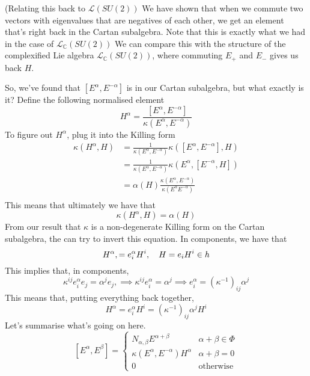 \begin{example}{(Relating this back to $ \mathcal{ L } ( SU ( 2) ) $}
We have shown that when we commute 
two vectors with eigenvalues that are negatives of each other, 
we get an element that's right back in the 
Cartan subalgebra.
Note that this is exactly what we had 
in the case of $ \mathcal{ L } _ \mathbb{ C} ( S U( 2) ) $
We can compare this with the structure of 
the complexified Lie algebra $ \mathcal{ L } _{ \mathbb{ C} } ( SU ( 2) ) $, 
where commuting $ E_ + $ and $ E _ - $ gives us back $ H $. 
\end{example}

So, we've found that $ [ E ^ \alpha , E ^{ - \alpha }  ] $ is 
in our Cartan subalgebra, but what exactly is it? 
Define the following normalised element 
\[
	H ^ \alpha  = \frac{ [ E ^ \alpha , E ^{ - \alpha }  ] }{ 
	\kappa ( E ^ \alpha , E ^{ - \alpha } ) }
\] To figure out $ H ^ \alpha $, plug it into the Killing form 
\begin{align*}
	\kappa ( H ^ \alpha , H ) &=  \frac{1}{\kappa ( E ^ \alpha , E ^{ - \alpha } )  } 
	\kappa ( [ E ^ \alpha , E ^{ - \alpha } ] , H ) \\
				  &=  \frac{1}{\kappa ( E ^ \alpha , E ^{ - \alpha } ) } 
				  \kappa ( E ^ \alpha , [ E ^{ - \alpha } , H ] ) \\
				  &=  \alpha ( H ) \frac{
				  \kappa \left(  E ^ \alpha , E ^{ - \alpha }  \right) }{ 
			  \kappa \left(  E ^{ \alpha  } E ^{ - \alpha } \right) } \\
\end{align*} 
This means that ultimately we have that 
\[
	\kappa \left(  H ^ \alpha, H  \right)   = \alpha \left(  H  \right) 
\] From our result that $ \kappa $ is a non-degenerate 
Killing form on the Cartan subalgebra, 
the can try to invert this equation. 
In components, we have that 
\[
 H^ \alpha ,  = e_ i ^ \alpha H ^ i , \quad H  = e _ i H ^ i \in h
\] This implies that, in components, 
\[
	\kappa ^{ ij } e _ i ^ \alpha e _ j  = \alpha ^ j e _ j , \implies \kappa ^{ ij } e _ i ^ \alpha 
	= \alpha ^ j  \implies e _ i ^ \alpha  = ( \kappa ^{ - 1} ) _{ ij } \alpha ^ j 
\] This means that, putting everything back together, 
\[
 H ^ \alpha = e _ i ^ \alpha H ^ i  = \left(  \kappa ^{ - 1}  \right)  _{ ij  } \alpha ^ j H ^ i 
\]Let's summarise what's going on here. 
\[
	[ E ^ \alpha , E ^ \beta ]  =\begin{cases}
		N_{ \alpha, \beta } E ^{ \alpha + \beta } & \alpha + \beta \in \Phi \\
		\kappa ( E ^{ \alpha } , E ^{ - \alpha } ) H ^ \alpha & \alpha + \beta  = 0 \\
		 0 & \text{otherwise}
	\end{cases}
\] 
